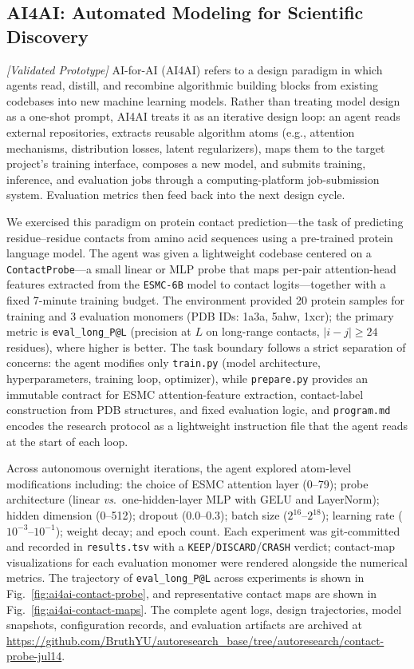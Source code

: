 \documentclass[sn-basic,Numbered,pdflatex]{sn-jnl}
\begin{document}
\FloatBarrier
\subsection{AI4AI: Automated Modeling for Scientific Discovery}

\textit{[Validated Prototype]} AI-for-AI (AI4AI) refers to a design paradigm in which agents read, distill, and recombine algorithmic building blocks from existing codebases into new machine learning models. Rather than treating model design as a one-shot prompt, AI4AI treats it as an iterative design loop: an agent reads external repositories, extracts reusable algorithm atoms (e.g., attention mechanisms, distribution losses, latent regularizers), maps them to the target project's training interface, composes a new model, and submits training, inference, and evaluation jobs through a computing-platform job-submission system. Evaluation metrics then feed back into the next design cycle.

We exercised this paradigm on protein contact prediction---the task of predicting residue--residue contacts from amino acid sequences using a pre-trained protein language model. The agent was given a lightweight codebase centered on a \texttt{ContactProbe}---a small linear or MLP probe that maps per-pair attention-head features extracted from the \texttt{ESMC-6B} model to contact logits---together with a fixed 7-minute training budget. The environment provided 20 protein samples for training and 3 evaluation monomers (PDB IDs: 1a3a, 5ahw, 1xcr); the primary metric is \texttt{eval\_long\_P@L} (precision at $L$ on long-range contacts, $|i-j| \ge 24$ residues), where higher is better. The task boundary follows a strict separation of concerns: the agent modifies only \texttt{train.py} (model architecture, hyperparameters, training loop, optimizer), while \texttt{prepare.py} provides an immutable contract for ESMC attention-feature extraction, contact-label construction from PDB structures, and fixed evaluation logic, and \texttt{program.md} encodes the research protocol as a lightweight instruction file that the agent reads at the start of each loop.

Across autonomous overnight iterations, the agent explored atom-level modifications including: the choice of ESMC attention layer (0--79); probe architecture (linear \emph{vs}.~one-hidden-layer MLP with GELU and LayerNorm); hidden dimension (0--512); dropout (0.0--0.3); batch size ($2^{16}$--$2^{18}$); learning rate ($10^{-3}$--$10^{-1}$); weight decay; and epoch count. Each experiment was git-committed and recorded in \texttt{results.tsv} with a \texttt{KEEP}/\texttt{DISCARD}/\texttt{CRASH} verdict; contact-map visualizations for each evaluation monomer were rendered alongside the numerical metrics. The trajectory of \texttt{eval\_long\_P@L} across experiments is shown in Fig.~\ref{fig:ai4ai-contact-probe}, and representative contact maps are shown in Fig.~\ref{fig:ai4ai-contact-maps}. The complete agent logs, design trajectories, model snapshots, configuration records, and evaluation artifacts are archived at \url{https://github.com/BruthYU/autoresearch_base/tree/autoresearch/contact-probe-jul14}.
\end{document}
